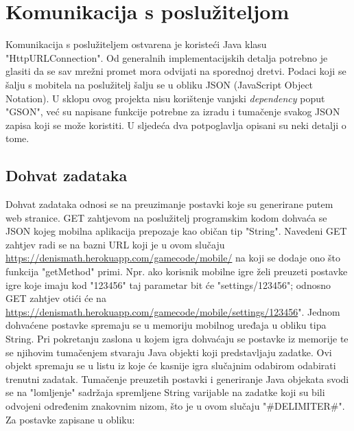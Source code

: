 \documentclass[times, utf8, zavrsni, numeric]{fer}
\begin{document}
	
	\section{Komunikacija s poslužiteljom}
	Komunikacija s poslužiteljem ostvarena je koristeći Java klasu "HttpURLConnection". Od generalnih implementacijskih detalja potrebno je glasiti da se sav mrežni promet mora odvijati na sporednoj dretvi. 
	Podaci koji se šalju s mobitela na poslužitelj šalju se u obliku JSON (JavaScript Object Notation). U sklopu ovog projekta nisu korištenje vanjski \textit{dependency} poput "GSON", već
	su napisane funkcije potrebne za izradu i tumačenje svakog JSON zapisa koji se može koristiti. U sljedeća dva potpoglavlja opisani su neki detalji o tome.
	\subsection{Dohvat zadataka}
	Dohvat zadataka odnosi se na preuzimanje postavki koje su generirane putem web stranice. GET zahtjevom na poslužitelj programskim kodom dohvaća se JSON kojeg mobilna aplikacija prepozaje kao običan tip "String".
	Navedeni GET zahtjev radi se na bazni URL koji je u ovom slučaju  \url{https://denismath.herokuapp.com/gamecode/mobile/} na koji se dodaje ono što funkcija "getMethod" primi. Npr. ako korisnik mobilne igre želi preuzeti postavke
	igre koje imaju kod "123456"  taj parametar bit će "settings/123456"; odnosno GET zahtjev otići će na \url{https://denismath.herokuapp.com/gamecode/mobile/settings/123456}".
	Jednom dohvaćene postavke spremaju se u memoriju mobilnog uređaja u obliku tipa String. Pri pokretanju zaslona u kojem igra dohvaćaju se postavke iz memorije te se njihovim tumačenjem stvaraju Java objekti koji predstavljaju zadatke.
	Ovi objekt spremaju se u listu iz koje će kasnije igra slučajnim odabirom odabirati trenutni zadatak. Tumačenje preuzetih postavki i generiranje Java objekata svodi se na "lomljenje" sadržaja spremljene String varijable
	na zadatke koji su bili odvojeni određenim znakovnim nizom, što je u ovom slučaju "\#DELIMITER\#".
	Za postavke zapisane u obliku:
	
\end{document}
